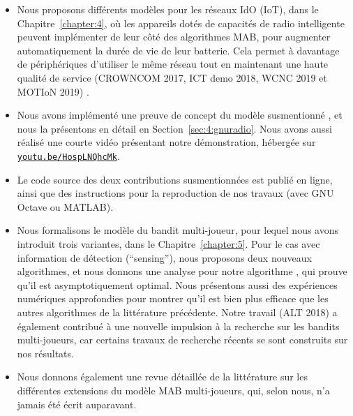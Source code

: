 \begin{resume_fr}
\begin{itemize}
    \item
    Nous proposons différents modèles pour les réseaux IdO (IoT), dans le Chapitre~\ref{chapter:4}, où les appareils dotés de capacités de radio intelligente peuvent implémenter de leur côté des algorithmes MAB, pour augmenter automatiquement la durée de vie de leur batterie. Cela permet à davantage de périphériques d'utiliser le même réseau tout en maintenant une haute qualité de service
    (CROWNCOM 2017, ICT demo 2018, WCNC 2019 et MOTIoN 2019)
    \cite{Bonnefoi17,Besson2019WCNC,Bonnefoi2019WCNC}.

    \item
    Nous avons implémenté une preuve de concept du modèle susmentionné \cite{Besson2018ICT}, et nous la présentons en détail en Section~\ref{sec:4:gnuradio}. Nous avons aussi réalisé une courte vidéo présentant notre démonstration, hébergée sur \texttt{\href{https://youtu.be/HospLNQhcMk}{youtu.be/HospLNQhcMk}}.

    \item
    Le code source des deux contributions susmentionnées est publié en ligne, ainsi que des instructions pour la reproduction de nos travaux (avec GNU Octave ou MATLAB).

    \item
    Nous formalisons le modèle du bandit multi-joueur, pour lequel nous avons introduit trois variantes, dans le Chapitre~\ref{chapter:5}.
    Pour le cas avec information de détection (``sensing''), nous proposons deux nouveaux algorithmes, et nous donnons une analyse pour notre algorithme \MCTopM, qui prouve qu'il est asymptotiquement optimal.
    Nous présentons aussi des expériences numériques approfondies pour montrer qu'il est bien plus efficace que les autres algorithmes de la littérature précédente.
    Notre travail \cite{Besson2018ALT} (ALT 2018) a également contribué à une nouvelle impulsion à la recherche sur les bandits multi-joueurs, car certains travaux de recherche récents se sont construits sur nos résultats.

    \item
    Nous donnons également une revue détaillée de la littérature sur les différentes extensions du modèle MAB multi-joueurs, qui, selon nous, n'a jamais été écrit auparavant.


\end{itemize}
\end{resume_fr}
